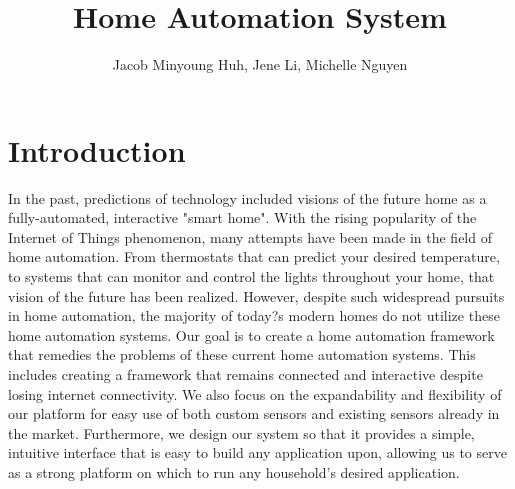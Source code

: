 \documentclass[10pt,twocolumn]{article}
\title{Home Automation System}
\author{Jacob Minyoung Huh, Jene Li, Michelle Nguyen}
\begin{document}
\maketitle
\section*{Introduction}
In the past, predictions of technology included visions of the future home as a fully-automated, interactive "smart home". With the rising popularity of the Internet of Things phenomenon, many attempts have been made in the field of home automation. From thermostats that can predict your desired temperature, to systems that can monitor and control the lights throughout your home, that vision of the future has been realized. However, despite such widespread pursuits in home automation, the majority of today?s modern homes do not utilize these home automation systems. Our goal is to create a home automation framework that remedies the problems of these current home automation systems. This includes creating a framework that remains connected and interactive despite losing internet connectivity. We also focus on the expandability and flexibility of our platform for easy use of both custom sensors and existing sensors already in the market. Furthermore, we design our system so that it provides a simple, intuitive interface that is easy to build any application upon, allowing us to serve as a strong platform on which to run any household's desired application. 
\end{document}
